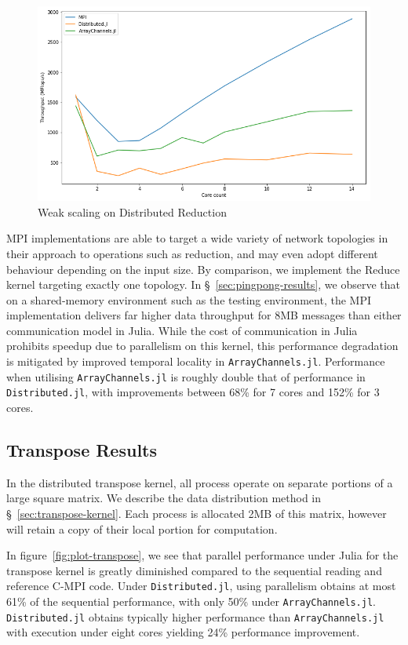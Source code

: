 \documentclass{juliacon}
\begin{document}
\begin{figure}[htb]
	\includegraphics[width=\linewidth]{figs/reduce.png}
	\caption{Weak scaling on Distributed Reduction}
	\label{fig:plot-reduce}
\end{figure}

MPI implementations are able to target a wide variety of network
topologies in their approach to operations such as reduction, and may
even adopt different behaviour depending on the input size. By
comparison, we implement the Reduce kernel targeting exactly one
topology. In \S~\ref{sec:pingpong-results}, we observe that on a
shared-memory environment such as the testing environment, the MPI
implementation delivers far higher data throughput for 8MB messages than
either communication model in Julia. While the cost of communication in
Julia prohibits speedup due to parallelism on this kernel, this
performance degradation is mitigated by improved temporal locality in
\texttt{ArrayChannels.jl}. Performance when utilising \texttt{ArrayChannels.jl} is roughly double that of performance in \texttt{Distributed.jl}, with improvements between 68\% for 7 cores and 152\% for 3 cores.

\subsection{Transpose Results}
\label{sec:transpose-results}

In the distributed transpose kernel, all process operate on separate
portions of a large square matrix. We describe the data distribution
method in \S~\ref{sec:transpose-kernel}. Each process is allocated
2MB of this matrix, however will retain a copy of their local portion
for computation.

In figure~\ref{fig:plot-transpose}, we see that parallel performance
under Julia for the transpose kernel is greatly diminished compared to
the sequential reading and reference C-MPI code. Under
\texttt{Distributed.jl}, using parallelism obtains at most 61\% of the
sequential performance, with only 50\% under \texttt{ArrayChannels.jl}.
\texttt{Distributed.jl} obtains typically higher performance than
\texttt{ArrayChannels.jl} with execution under eight cores yielding 24\%
performance improvement.
\end{document}
